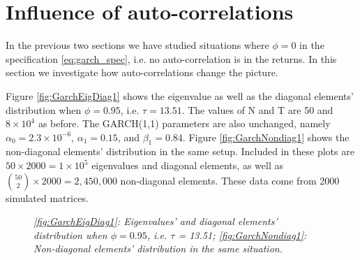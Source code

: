\documentclass{report}
\begin{document}
\section{Influence of auto-correlations}
\label{sec:garch_nonzero_phi}
In the previous two sections we have studied situations where
$\phi=0$ in the specification \ref{eq:garch_spec}, i.e. no
auto-correlation is in the returns. In this section we investigate how
auto-correlations change the picture.


Figure \ref{fig:GarchEigDiag1} shows the eigenvalue as well as the
diagonal elements' distribution when $\phi = 0.95$, i.e. $\tau =
13.51$. The values of N and T are 50 and $8\times 10^4$ as before. The
GARCH(1,1) parameters are also unchanged, namely $\alpha_0 = 2.3\times
10^{-6}$, $\alpha_1 = 0.15$, and $\beta_1 = 0.84$. Figure
\ref{fig:GarchNondiag1} shows the non-diagonal elements' distribution
in the same setup. Included in these plots are $50 \times 2000 =
1\times 10^5$ eigenvalues and diagonal elements, as well as ${50
  \choose 2} \times 2000 = 2,450,000$ non-diagonal elements. These
data come from 2000 simulated matrices.
\begin{figure}[htb!]
  \centering
  \caption{\small \it \ref{fig:GarchEigDiag1}: Eigenvalues' and
    diagonal elements' distribution when $\phi = 0.95$, i.e. $\tau$ =
    13.51; \ref{fig:GarchNondiag1}: Non-diagonal elements'
    distribution in the same situation.}
\end{figure}
\end{document}
